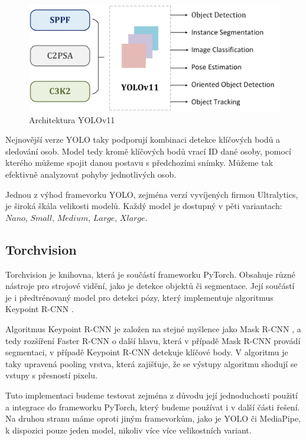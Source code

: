 \begin{figure}[]
    \centering
    \includegraphics[height=0.2\textheight]{Figures/yolo_v11.png}
    \caption{Architektura YOLOv11 \cite{yolov11}}
    \label{fig:yolov11}
\end{figure}

Nejnovější verze YOLO taky podporují kombinaci detekce klíčových bodů a
sledování osob. Model tedy kromě klíčových bodů vrací ID dané osoby, pomocí
kterého můžeme spojit danou postavu s předchozími snímky. Můžeme tak efektivně
analyzovat pohyby jednotlivých osob.

Jednou z výhod framevorku YOLO, zejména verzí vyvíjených firmou Ultralytics, je
široká škála velikosti modelů. Každý model je dostupný v pěti variantach:
$Nano$, $Small$, $Medium$, $Large$, $Xlarge$.

\subsection{Torchvision}

Torchvision je knihovna, která je součástí frameworku PyTorch. Obsahuje různé
nástroje pro strojové vidění, jako je detekce objektů či segmentace. Její
součástí je i předtrénovaný model pro detekci pózy, který implementuje
algoritmus Keypoint R-CNN \cite{keypoint-rcnn}.

Algoritmus Keypoint R-CNN je založen na stejné myšlence jako Mask R-CNN
\cite{mask-r-cnn}, a tedy rozšíření Faster R-CNN o další hlavu, která v případě
Mask R-CNN provádí segmentaci, v případě Keypoint R-CNN detekuje klíčové body.
V algoritmu je taky upravená pooling vrstva, která zajišťuje, že se výstupy
algoritmu shodují se vstupy s přesností pixelu.

Tuto implementaci budeme testovat zejména z důvodu její jednoduchosti použití a
integrace do frameworku PyTorch, který budeme používat i v další části řešení.
Na druhou stranu máme oproti jiným framevorkům, jako je YOLO či MediaPipe, k
dispozici pouze jeden model, nikoliv více více velikostních variant.

